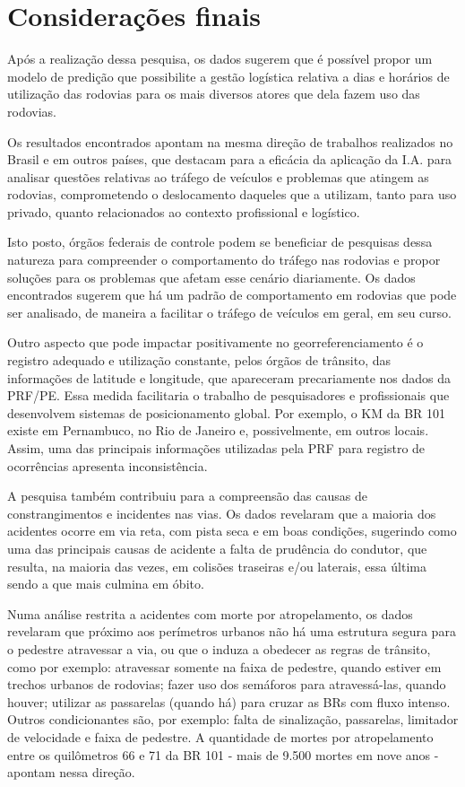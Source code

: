\chapter{Considerações finais}\label{intro:resumen}

Após a realização dessa pesquisa, os dados sugerem que é possível propor um modelo de predição que possibilite a gestão logística relativa a dias e horários de utilização das rodovias para os mais diversos atores que dela fazem uso das rodovias.  

Os resultados encontrados apontam na mesma direção de trabalhos realizados no Brasil e em outros países, que destacam para a eficácia da aplicação da I.A. para analisar questões relativas ao tráfego de veículos e problemas que atingem as rodovias, comprometendo o deslocamento daqueles que a utilizam, tanto para uso privado, quanto relacionados ao contexto profissional e logístico. 

Isto posto, órgãos federais de controle podem se beneficiar de pesquisas dessa natureza para compreender o comportamento do tráfego nas rodovias e propor soluções para os problemas que afetam esse cenário diariamente. Os dados encontrados sugerem que há um padrão de comportamento em rodovias que pode ser analisado, de maneira a facilitar o tráfego de veículos em geral, em seu curso. 

Outro aspecto que pode impactar positivamente no georreferenciamento é o registro adequado e utilização constante, pelos órgãos de trânsito, das informações de latitude e longitude, que apareceram precariamente nos dados da PRF/PE. Essa medida facilitaria o trabalho de pesquisadores e profissionais que desenvolvem sistemas de posicionamento global. Por exemplo, o KM da BR 101 existe em Pernambuco, no Rio de Janeiro e, possivelmente, em outros locais. Assim, uma das principais informações utilizadas pela PRF para registro de ocorrências apresenta inconsistência.     

A pesquisa também contribuiu para a compreensão das causas de constrangimentos e incidentes nas vias. Os dados revelaram que a maioria dos acidentes ocorre em via reta, com pista seca e em boas condições, sugerindo como uma das principais causas de acidente a falta de prudência do condutor, que resulta, na maioria das vezes, em colisões traseiras e/ou laterais, essa última sendo a que mais culmina em óbito. 

Numa análise restrita a acidentes com morte por atropelamento, os dados revelaram que próximo aos perímetros urbanos não há uma estrutura segura para o pedestre atravessar a via, ou que o induza a obedecer as regras de trânsito, como por exemplo: atravessar somente na faixa de pedestre, quando estiver em trechos urbanos de rodovias; fazer uso dos semáforos para atravessá-las, quando houver; utilizar as passarelas (quando há) para cruzar as BRs com fluxo intenso. Outros condicionantes são, por exemplo: falta de sinalização, passarelas, limitador de velocidade e faixa de pedestre. A quantidade de mortes por atropelamento entre os quilômetros 66 e 71 da BR 101 - mais de 9.500 mortes em nove anos - apontam nessa direção.

